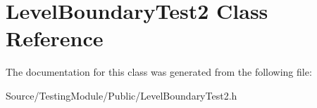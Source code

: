 \hypertarget{class_level_boundary_test2}{}\section{Level\+Boundary\+Test2 Class Reference}
\label{class_level_boundary_test2}


The documentation for this class was generated from the following file\+:\begin{DoxyCompactItemize}
\item 
Source/\+Testing\+Module/\+Public/Level\+Boundary\+Test2.\+h\end{DoxyCompactItemize}
